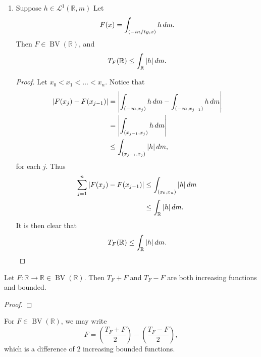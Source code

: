 \documentclass[notoc,notitlepage]{tufte-book}
\DeclareMathOperator{\BV}{BV}
\begin{document}
\begin{eg}
\begin{enumerate}
    \item Suppose $h \in \mathcal{L}^1(\mathbb{R}, m)$
      Let
      \begin{equation*}
        F(x) = \int_{(-infty, x)} h \mathop{}\!d{m}.
      \end{equation*}
      Then $F \in \BV(\mathbb{R})$, and
      \begin{equation*}
        T_F(\mathbb{R}) \leq \int_{\mathbb{R}} \left|h\right| \mathop{}\!d{m}.
      \end{equation*}

      \begin{proof}
        Let $x_0 < x_1 < \hdots < x_n$. Notice that
        \begin{align*}
          \left|F(x_j) - F(x_{j-1})\right|
          &= \left|\int_{(-\infty, x_j)} h \mathop{}\!d{m}
              - \int_{(-\infty, x_{j-1})} h \mathop{}\!d{m}\right| \\
          &= \left|\int_{(x_{j-1}, x_j)} h \mathop{}\!d{m}\right| \\
          &\leq \int_{(x_{j-1}, x_j)} \left|h\right| \mathop{}\!d{m},
        \end{align*}
        for each $j$.
        Thus
        \begin{align*}
          \sum_{j=1}^{n} \left|F(x_j) - F(x_{j-1})\right|
          &\leq \int_{(x_0, x_n)} \left|h\right| \mathop{}\!d{m} \\
          &\leq \int_{\mathbb{R}} \left|h\right| \mathop{}\!d{m}.
        \end{align*}
        It is then clear that
        \begin{equation*}
          T_F(\mathbb{R}) \leq \int_{\mathbb{R}} \left|h\right| \mathop{}\!d{m}.
        \end{equation*}
      \end{proof}
  \end{enumerate}
\end{eg}

\begin{lemma}\label{lemma:total_variation_pm_f_}
  Let $F : \mathbb{R} \to \mathbb{R} \in \BV(\mathbb{R})$. Then
  $T_F + F$ and $T_F - F$ are both increasing functions and bounded.
\end{lemma}

\begin{proof}
\end{proof}

\begin{note}\label{note:jordan_decomposition_of_a_function}
  For $F \in \BV(\mathbb{R})$, we may write
  \begin{equation*}
    F = \left( \frac{T_F + F}{2} \right) - \left( \frac{T_F - F}{2} \right),
  \end{equation*}
  which is a difference of $2$ increasing bounded functions.
\end{note}
\end{document}
